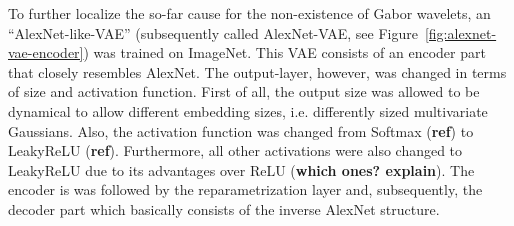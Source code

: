 To further localize the so-far cause for the non-existence of Gabor wavelets, an ``AlexNet-like-VAE'' (subsequently called AlexNet-VAE, see Figure~\ref{fig:alexnet-vae-encoder}) was trained on ImageNet.
This \ac{VAE} consists of an encoder part that closely resembles AlexNet.
The output-layer, however, was changed in terms of size and activation function.
First of all, the output size was allowed to be dynamical to allow different embedding sizes, i.e. differently sized multivariate Gaussians.
Also, the activation function was changed from Softmax (\textbf{ref}) to \ac{LeakyReLU} (\textbf{ref}).
Furthermore, all other activations were also changed to \ac{LeakyReLU} due to its advantages over \ac{ReLU} (\textbf{which ones? explain}).
The encoder is was followed by the reparametrization layer and, subsequently, the decoder part which basically consists of the inverse AlexNet structure.\par

